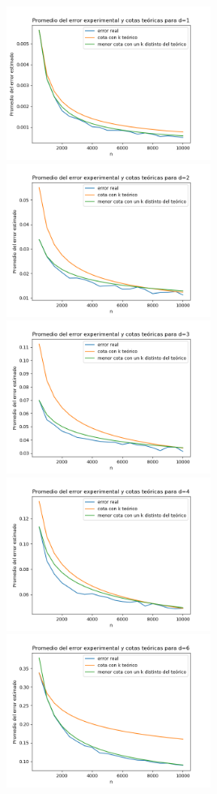 \documentclass[12pt, a4paper]{article}
\begin{document}
\includegraphics[width=0.5\textwidth]{figuras_h_dinamico/cotas-error-d=1}
\includegraphics[width=0.5\textwidth]{figuras_h_dinamico/cotas-error-d=2}
\includegraphics[width=0.5\textwidth]{figuras_h_dinamico/cotas-error-d=3}
\includegraphics[width=0.5\textwidth]{figuras_h_dinamico/cotas-error-d=4}
\includegraphics[width=0.5\textwidth]{figuras_h_dinamico/cotas-error-d=6}
\end{document}

